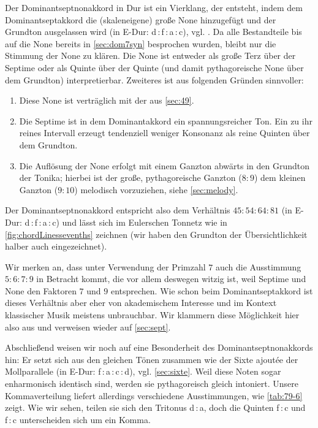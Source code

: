 Der Dominantseptnonakkord in Dur ist ein Vierklang, der entsteht, indem dem
Dominantseptakkord die (skaleneigene) große None hinzugefügt und der Grundton
ausgelassen wird (in \flat E-Dur: d\,:\,f\,:\,\flat a\,:\,c),
vgl. \cite[{}11.3]{Skript}.  Da alle Bestandteile bis auf die None bereits in
\cref{sec:dom7syn} besprochen wurden, bleibt nur die Stimmung der None zu
klären.  Die None ist entweder als große Terz über der Septime oder als Quinte
über der Quinte (und damit pythagoreische None über dem Grundton)
interpretierbar.  Zweiteres ist aus folgenden Gründen sinnvoller:
\begin{enumerate}
  \item Diese None ist verträglich mit der aus \cref{sec:49}.
  \item Die Septime ist in dem Dominantakkord ein spannungsreicher Ton.  Ein zu
    ihr reines Intervall erzeugt tendenziell weniger Konsonanz als reine Quinten
    über dem Grundton.
  \item Die Auflösung der None erfolgt mit einem Ganzton abwärts in den Grundton
  der Tonika; hierbei ist der große, pythagoreische Ganzton ($8:9$) dem kleinen
  Ganzton ($9:10$) melodisch vorzuziehen, siehe \cref{sec:melody}.
\end{enumerate}
Der Dominantseptnonakkord entspricht also dem Verhältnis $45:54:64:81$ (in \flat
E-Dur: \naturalm d\,:\,f\,:\,\flat a\,:\,c) und lässt sich im Eulerschen Tonnetz
wie in \cref{fig:chordLinessevenths} zeichnen (wir haben den Grundton der
Übersichtlichkeit halber auch eingezeichnet).

Wir merken an, dass unter Verwendung der Primzahl $7$ auch die Ausstimmung
$5:6:7:9$ in Betracht kommt, die vor allem deswegen witzig ist, weil Septime und
None den Faktoren $7$ und $9$ entsprechen.  Wie schon beim Dominantseptakkord
ist dieses Verhältnis aber eher von akademischem Interesse und im Kontext
klassischer Musik meistens unbrauchbar. Wir klammern diese Möglichkeit hier also
aus und verweisen wieder auf \cref{sec:sept}.

Abschließend weisen wir noch auf eine Besonderheit des Dominantseptnonakkords
hin: Er setzt sich aus den gleichen Tönen zusammen wie der Sixte ajoutée der
Mollparallele (in \flat E-Dur: f\,:\,\flat a\,:\,c\,:\,d),
vgl. \cref{sec:sixte}. Weil diese Noten sogar enharmonisch identisch sind,
werden sie pythagoreisch gleich intoniert. Unsere Kommaverteilung liefert
allerdings verschiedene Ausstimmungen, wie \cref{tab:79-6} zeigt.  Wie wir
sehen, teilen sie sich den Tritonus \naturalm d\,:\,\flat a, doch die Quinten
f\,:\,c und \naturalm f\,:\,\naturalm c unterscheiden sich um ein Komma.

